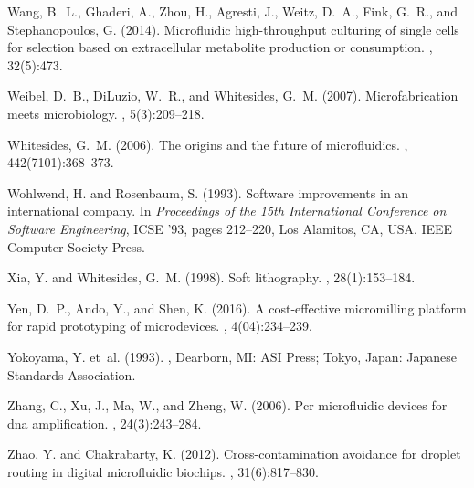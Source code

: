 \documentclass[12pt,letterpaper]{report}          %
\begin{document}
\begin{thebibliography}{}
Wang, B.~L., Ghaderi, A., Zhou, H., Agresti, J., Weitz, D.~A., Fink, G.~R., and
  Stephanopoulos, G. (2014).
\newblock Microfluidic high-throughput culturing of single cells for selection
  based on extracellular metabolite production or consumption.
, 32(5):473.

Weibel, D.~B., DiLuzio, W.~R., and Whitesides, G.~M. (2007).
\newblock Microfabrication meets microbiology.
, 5(3):209--218.

Whitesides, G.~M. (2006).
\newblock The origins and the future of microfluidics.
, 442(7101):368--373.

Wohlwend, H. and Rosenbaum, S. (1993).
\newblock Software improvements in an international company.
\newblock In {\em Proceedings of the 15th International Conference on Software
  Engineering}, ICSE '93, pages 212--220, Los Alamitos, CA, USA. IEEE Computer
  Society Press.

Xia, Y. and Whitesides, G.~M. (1998).
\newblock Soft lithography.
, 28(1):153--184.

Yen, D.~P., Ando, Y., and Shen, K. (2016).
\newblock A cost-effective micromilling platform for rapid prototyping of
  microdevices.
, 4(04):234--239.

Yokoyama, Y. et~al. (1993).
, Dearborn, MI: ASI Press; Tokyo, Japan: Japanese Standards Association.

Zhang, C., Xu, J., Ma, W., and Zheng, W. (2006).
\newblock Pcr microfluidic devices for dna amplification.
, 24(3):243--284.

Zhao, Y. and Chakrabarty, K. (2012).
\newblock Cross-contamination avoidance for droplet routing in digital
  microfluidic biochips.
, 31(6):817--830.

\end{thebibliography}

\cleardoublepage

 

\end{document}
